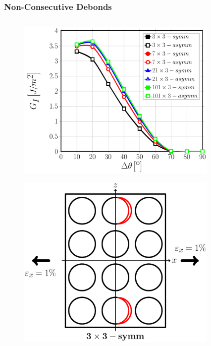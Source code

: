 \documentclass[first,firstsupp,lastsupp,last,hyperref,table]{ETHclass}
\begin{document}
\begin{frame}
\frametitle{\vspace{0.3cm}\small Non-Consecutive Debonds}
\vspace{-0.9cm}
\centering
\begin{columns}
\centering
\begin{column}{0.5\textwidth}
\centering
\begin{figure}
\centering
\includegraphics[width=\columnwidth]{nxk-coupling-vf60-GI.pdf}
\end{figure}
\vspace{-0.95cm}
\begin{figure}
\centering
\includegraphics[width=0.5\columnwidth]{twofibersbetweendebonds-sameside-dtheta80.pdf}
\end{figure}
\end{column}
\begin{column}{0.5\textwidth}
\centering
\begin{figure}
\centering

\end{figure}
\end{column}
\end{columns}
\end{frame}
\end{document}
